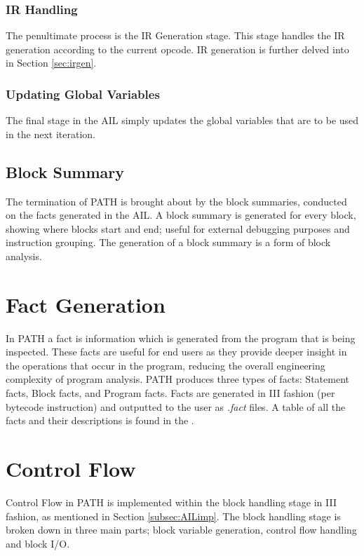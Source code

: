             \subsubsection*{\acs{IR} Handling}
            \par The penultimate process is the \acs{IR} Generation stage. This stage handles the \acs{IR} generation according to the current opcode. \acs{IR} generation is further delved into in Section \ref{sec:irgen}.
            \subsubsection*{Updating Global Variables}
            \par The final stage in the \acs{AIL} simply updates the global variables that are to be used in the next iteration.

        \subsection{Block Summary}
        \par The termination of \acs{PATH} is brought about by the block summaries, conducted on the facts generated in the \acs{AIL}. A block summary is generated for every block, showing where blocks start and end; useful for external debugging purposes and instruction grouping. The generation of a block summary is a form of block analysis. 

            
    \section{Fact Generation} \label{sec:factgen}
    \par In \acs{PATH} a fact is information which is generated from the program that is being inspected. These facts are useful for end users as they provide deeper insight in the operations that occur in the program, reducing the overall engineering complexity of program analysis. \acs{PATH} produces three types of facts: Statement facts, Block facts, and Program facts.
    Facts are generated in \acs{III} fashion (per bytecode instruction) and outputted to the user as \textit{.fact} files. A table of all the facts and their descriptions is found in the . 

    \section{Control Flow} \label{sec:cfimp}
    \par Control Flow in \acs{PATH} is implemented within the block handling stage in \acs{III} fashion, as mentioned in Section \ref{subsec:AILimp}. The block handling stage is broken down in three main parts; block variable generation, control flow handling and block \acs{I/O}.
